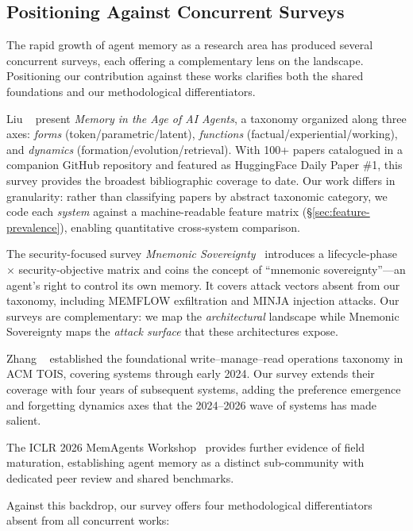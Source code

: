 \subsection{Positioning Against Concurrent Surveys}
\label{sec:competing-surveys}

The rapid growth of agent memory as a research area has produced several
concurrent surveys, each offering a complementary lens on the landscape.
Positioning our contribution against these works clarifies both the
shared foundations and our methodological differentiators.

Liu \etal~\cite{liu2025memoryage} present \emph{Memory in the Age of AI
Agents}, a taxonomy organized along three axes: \emph{forms}
(token/parametric/latent), \emph{functions}
(factual/experiential/working), and \emph{dynamics}
(formation/evolution/retrieval).  With 100+ papers catalogued in a
companion GitHub repository and featured as HuggingFace Daily Paper \#1,
this survey provides the broadest bibliographic coverage to date.  Our
work differs in granularity: rather than classifying papers by abstract
taxonomic category, we code each \emph{system} against a machine-readable
feature matrix (\S\ref{sec:feature-prevalence}), enabling quantitative
cross-system comparison.

The security-focused survey \emph{Mnemonic Sovereignty}~\cite{mnemonicsovereignty2026}
introduces a lifecycle-phase $\times$ security-objective matrix and coins
the concept of ``mnemonic sovereignty''---an agent's right to control its
own memory.  It covers attack vectors absent from our taxonomy, including
MEMFLOW exfiltration and MINJA injection attacks.  Our surveys are
complementary: we map the \emph{architectural} landscape while Mnemonic
Sovereignty maps the \emph{attack surface} that these architectures expose.

Zhang \etal~\cite{zhang2024survey} established the foundational
write--manage--read operations taxonomy in ACM TOIS, covering systems
through early 2024.  Our survey extends their coverage with four years
of subsequent systems, adding the preference emergence and forgetting
dynamics axes that the 2024--2026 wave of systems has made salient.

The ICLR 2026 MemAgents Workshop~\cite{memagentsworkshop2026} provides
further evidence of field maturation, establishing agent memory as a
distinct sub-community with dedicated peer review and shared benchmarks.

Against this backdrop, our survey offers four methodological
differentiators absent from all concurrent works:

